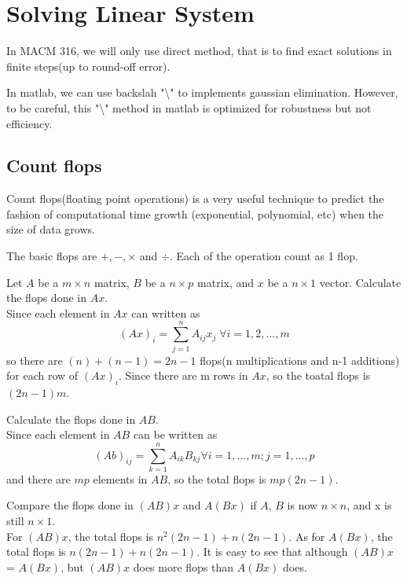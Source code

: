 	\chapter{Solving Linear System}
	In MACM 316, we will only use direct method, that is to find exact solutions in finite steps(up to round-off error).
	
	In matlab, we can use backslah "\textbackslash" to implements gaussian elimination. However, to be careful, this "\textbackslash" method in matlab is optimized for robustness but not efficiency.	
	
	\section{Count flops}
	Count flops(floating point operations) is a very useful technique to predict the fashion of computational time growth (exponential, polynomial, etc) when the size of data grows.
	
	
	The basic flops are $+,-,\times$ and $\div$. Each of the operation count as 1 flop.
	
	
	\begin{ex}
		Let $A$ be a $m\times n$ matrix, $B$ be a $n\times p$ matrix, and $x$ be a $n\times 1$ vector. Calculate the flops done in $Ax$. \\
		Since each element in $Ax$ can written as 
		\[(Ax)_i = \sum_{j=1}^n A_{ij}x_j \; \forall i=1,2,...,m\]
		so there are $(n)+(n-1) = 2n-1$ flops(n multiplications and n-1 additions) for each row of $(Ax)_i$. Since there are m rows in $Ax$, so the toatal flops is $(2n-1)m$.\\
	\end{ex}
	
	\begin{ex}
		Calculate the flops done in $AB$.\\
		Since each element in $AB$ can be written as
		\[(Ab)_{ij} = \sum_{k=1}^n A_{ik}B_{kj} \forall i=1,...,m ; j=1,...,p\]
		and there are $mp$ elements in $AB$, so the total flops is $mp(2n-1)$. \\
	\end{ex}

	\begin{ex}
		Compare the flops done in $(AB)x$ and $A(Bx)$ if $A$, $B$ is now $n\times n$, and x is still $n\times 1$.\\
		For $(AB)x$, the total flops is $n^2(2n-1) + n(2n-1)$. As for $A(Bx)$, the total flops is $n(2n-1) + n(2n-1)$. It is easy to see that although $(AB)x$ = $A(Bx)$, but $(AB)x$ does more flops than $A(Bx)$ does.
	\end{ex}	


